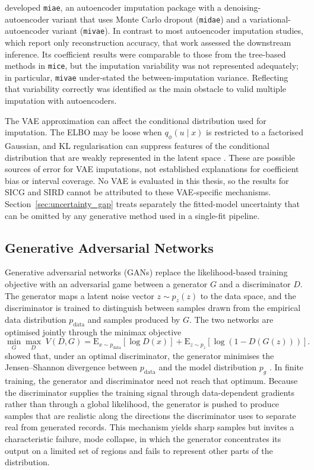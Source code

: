 \citet{deng2024thesis} developed \texttt{miae}, an autoencoder imputation package with a denoising-autoencoder variant that uses Monte Carlo dropout (\texttt{midae}) and a variational-autoencoder variant (\texttt{mivae}). In contrast to most autoencoder imputation studies, which report only reconstruction accuracy, that work assessed the downstream inference. Its coefficient results were comparable to those from the tree-based methods in \texttt{mice}, but the imputation variability was not represented adequately; in particular, \texttt{mivae} under-stated the between-imputation variance. Reflecting that variability correctly was identified as the main obstacle to valid multiple imputation with autoencoders.

The VAE approximation can affect the conditional distribution used for imputation. The ELBO may be loose when $q_{\phi}(u\mid x)$ is restricted to a factorised Gaussian, and KL regularisation can suppress features of the conditional distribution that are weakly represented in the latent space \citep{mattei2019miwae}. These are possible sources of error for VAE imputations, not established explanations for coefficient bias or interval coverage. No VAE is evaluated in this thesis, so the results for SICG and SIRD cannot be attributed to these VAE-specific mechanisms. Section~\ref{sec:uncertainty_gap} treats separately the fitted-model uncertainty that can be omitted by any generative method used in a single-fit pipeline.


\subsection{Generative Adversarial Networks}
\label{sec:gans}

Generative adversarial networks (GANs) \citep{goodfellow2014generative} replace the likelihood-based training objective with an adversarial game between a generator $G$ and a discriminator $D$. The generator maps a latent noise vector $z \sim p_z(z)$ to the data space, and the discriminator is trained to distinguish between samples drawn from the empirical data distribution $p_{\mathrm{data}}$ and samples produced by $G$. The two networks are optimised jointly through the minimax objective
\begin{equation}
    \min_G \max_D \; V(D, G)
    = \mathrm{E}_{x \sim p_{\mathrm{data}}}[\log D(x)]
    + \mathrm{E}_{z \sim p_z}[\log(1 - D(G(z)))].
    \label{eq:gan_obj}
\end{equation}
\citet{goodfellow2014generative} showed that, under an optimal discriminator, the generator minimises the Jensen--Shannon divergence between $p_{\mathrm{data}}$ and the model distribution $p_g$ \citep{lin1991divergence}. In finite training, the generator and discriminator need not reach that optimum. Because the discriminator supplies the training signal through data-dependent gradients rather than through a global likelihood, the generator is pushed to produce samples that are realistic along the directions the discriminator uses to separate real from generated records. This mechanism yields sharp samples but invites a characteristic failure, mode collapse, in which the generator concentrates its output on a limited set of regions and fails to represent other parts of the distribution.

